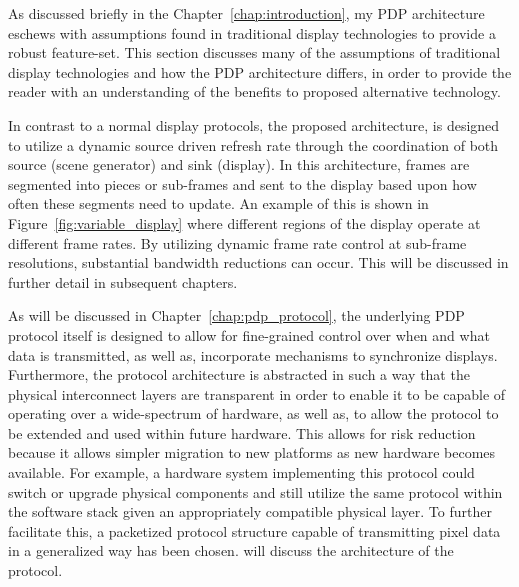     As discussed briefly in the Chapter~\ref{chap:introduction}, my PDP architecture eschews with assumptions found in traditional display technologies to provide a robust feature-set. This section discusses many of the assumptions of traditional display technologies and how the PDP architecture differs, in order to provide the reader with an understanding of the benefits to proposed alternative technology.

    In contrast to a normal display protocols, the proposed architecture, is designed to utilize a dynamic source driven refresh rate through the coordination of both source (scene generator) and sink (display). In this architecture, frames are segmented into pieces or sub-frames and sent to the display based upon how often these segments need to update. An example of this is shown in Figure~\ref{fig:variable_display} where different regions of the display operate at different frame rates. By utilizing dynamic frame rate control at sub-frame resolutions, substantial bandwidth reductions can occur. This will be discussed in further detail in subsequent chapters.

    As will be discussed in Chapter~\ref{chap:pdp_protocol}, the underlying PDP protocol itself is designed to allow for fine-grained control over when and what data is transmitted, as well as, incorporate mechanisms to synchronize displays. Furthermore, the protocol architecture is abstracted in such a way that the physical interconnect layers are transparent in order to enable it to be capable of operating over a wide-spectrum of hardware, as well as, to allow the protocol to be extended and used within future hardware. This allows for risk reduction because it allows simpler migration to new platforms as new hardware becomes available. For example, a hardware system implementing this protocol could switch or upgrade physical components and still utilize the same protocol within the software stack given an appropriately compatible physical layer. To further facilitate this, a packetized protocol structure capable of transmitting pixel data in a generalized way has been chosen. will discuss the architecture of the protocol.

